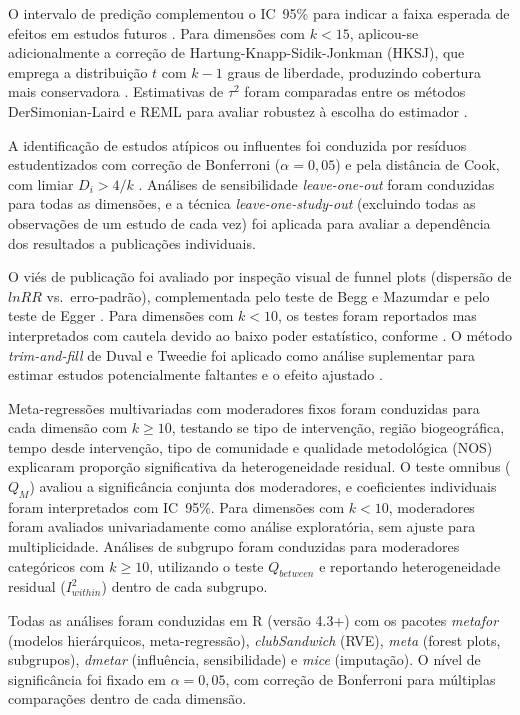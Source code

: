 O intervalo de predição complementou o IC~95\% para indicar a faixa esperada de efeitos em estudos futuros \cite{IntHout2016}. Para dimensões com $k < 15$, aplicou-se adicionalmente a correção de Hartung-Knapp-Sidik-Jonkman (HKSJ), que emprega a distribuição $t$ com $k-1$ graus de liberdade, produzindo cobertura mais conservadora \cite{Higgins2019}. Estimativas de $\tau^2$ foram comparadas entre os métodos DerSimonian-Laird e REML para avaliar robustez à escolha do estimador \cite{Borenstein2009}.

A identificação de estudos atípicos ou influentes foi conduzida por resíduos estudentizados com correção de Bonferroni ($\alpha = 0{,}05$) e pela distância de Cook, com limiar $D_i > 4/k$ \cite{Viechtbauer2010}. Análises de sensibilidade \textit{leave-one-out} foram conduzidas para todas as dimensões, e a técnica \textit{leave-one-study-out} (excluindo todas as observações de um estudo de cada vez) foi aplicada para avaliar a dependência dos resultados a publicações individuais.

O viés de publicação foi avaliado por inspeção visual de funnel plots (dispersão de $lnRR$ vs.\ erro-padrão), complementada pelo teste de Begg e Mazumdar \cite{Begg1994} e pelo teste de Egger \cite{Sterne2005}. Para dimensões com $k < 10$, os testes foram reportados mas interpretados com cautela devido ao baixo poder estatístico, conforme . O método \textit{trim-and-fill} de Duval e Tweedie foi aplicado como análise suplementar para estimar estudos potencialmente faltantes e o efeito ajustado \cite{Duval2000}.

Meta-regressões multivariadas com moderadores fixos foram conduzidas para cada dimensão com $k \geq 10$, testando se tipo de intervenção, região biogeográfica, tempo desde intervenção, tipo de comunidade e qualidade metodológica (NOS) explicaram proporção significativa da heterogeneidade residual. O teste omnibus ($Q_M$) avaliou a significância conjunta dos moderadores, e coeficientes individuais foram interpretados com IC~95\%. Para dimensões com $k < 10$, moderadores foram avaliados univariadamente como análise exploratória, sem ajuste para multiplicidade. Análises de subgrupo foram conduzidas para moderadores categóricos com $k \geq 10$, utilizando o teste $Q_{between}$ e reportando heterogeneidade residual ($I^2_{within}$) dentro de cada subgrupo.

Todas as análises foram conduzidas em R (versão 4.3+) com os pacotes \textit{metafor} \cite{Viechtbauer2010} (modelos hierárquicos, meta-regressão), \textit{clubSandwich} \cite{Pustejovsky2022} (RVE), \textit{meta} (forest plots, subgrupos), \textit{dmetar} (influência, sensibilidade) e \textit{mice} \cite{vanBuuren2011} (imputação). O nível de significância foi fixado em $\alpha = 0{,}05$, com correção de Bonferroni para múltiplas comparações dentro de cada dimensão.

